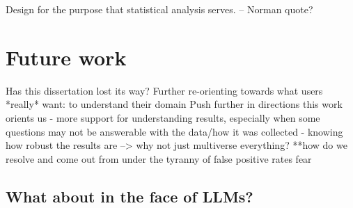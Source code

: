 Design for the purpose that statistical analysis serves. -- Norman quote?

\section{Future work}
Has this dissertation lost its way? Further re-orienting towards what users *really* want: to understand their domain
Push further in directions this work orients us 
- more support for understanding results, especially when some questions may not be answerable with the data/how it was collected
- knowing how robust the results are --> why not just multiverse everything?
**how do we resolve and come out from under the tyranny of false positive rates fear

\subsection{}
\subsection{What about in the face of LLMs?}
